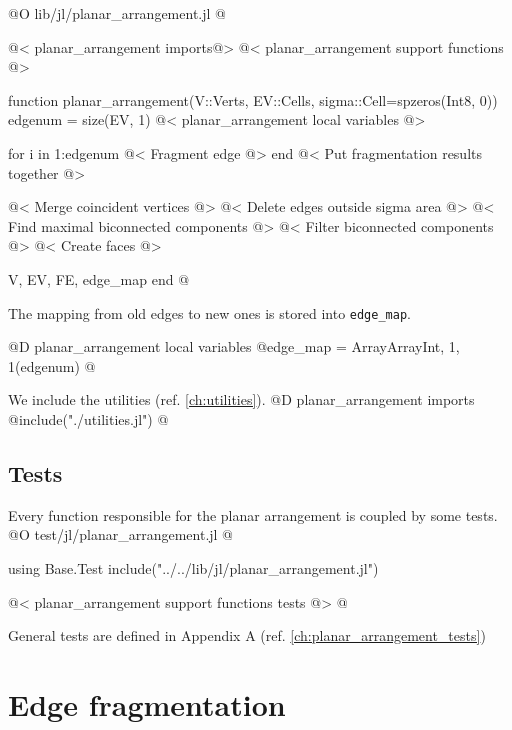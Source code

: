 @O lib/jl/planar_arrangement.jl
@{@< planar\_arrangement imports@>
@< planar\_arrangement support functions @>

function planar_arrangement(V::Verts, EV::Cells, sigma::Cell=spzeros(Int8, 0))
    edgenum = size(EV, 1)
    @< planar\_arrangement local variables @>

    for i in 1:edgenum
        @< Fragment edge @>
    end
    @< Put fragmentation results together @>

    @< Merge coincident vertices @>
    @< Delete edges outside sigma area @>
    @< Find maximal biconnected components @>
    @< Filter biconnected components @>
    @< Create faces @>  
    
    V, EV, FE, edge_map
end 
@}

The mapping from old edges to new ones is stored into \texttt{edge\_map}.

@D planar\_arrangement local variables
@{edge_map = Array{Array{Int, 1}, 1}(edgenum)
@}

We include the utilities (ref. \ref{ch:utilities}).
@D planar\_arrangement imports
@{include("./utilities.jl")
@}
\subsection{Tests}
Every function responsible for the planar arrangement is coupled by some tests. 
@O test/jl/planar_arrangement.jl
@{using Base.Test
include("../../lib/jl/planar_arrangement.jl")

@< planar\_arrangement support functions tests @>
@}
General tests are defined in Appendix A (ref. \ref{ch:planar_arrangement_tests})










\section{Edge fragmentation}
